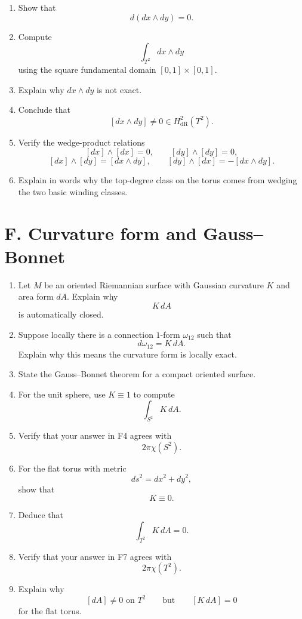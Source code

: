 \documentclass[11pt]{article}
\begin{document}
	\begin{enumerate}[leftmargin=2em,label=\textbf{E\arabic*.}]
		\item Show that
		\[
		d(dx\wedge dy)=0.
		\]
		
		\item Compute
		\[
		\int_{T^2}dx\wedge dy
		\]
		using the square fundamental domain \([0,1]\times[0,1]\).
		
		\item Explain why \(dx\wedge dy\) is not exact.
		
		\item Conclude that
		\[
		[dx\wedge dy]\neq 0 \in H^2_{\mathrm{dR}}(T^2).
		\]
		
		\item Verify the wedge-product relations
		\[
		[dx]\wedge[dx]=0,\qquad [dy]\wedge[dy]=0,
		\]
		\[
		[dx]\wedge[dy]=[dx\wedge dy],\qquad
		[dy]\wedge[dx]=-[dx\wedge dy].
		\]
		
		\item Explain in words why the top-degree class on the torus comes from wedging the two basic winding classes.
	\end{enumerate}
	
	\section*{F. Curvature form and Gauss--Bonnet}
	
	\begin{enumerate}[leftmargin=2em,label=\textbf{F\arabic*.}]
		\item Let \(M\) be an oriented Riemannian surface with Gaussian curvature \(K\) and area form \(dA\). Explain why
		\[
		K\,dA
		\]
		is automatically closed.
		
		\item Suppose locally there is a connection \(1\)-form \(\omega_{12}\) such that
		\[
		d\omega_{12}=K\,dA.
		\]
		Explain why this means the curvature form is locally exact.
		
		\item State the Gauss--Bonnet theorem for a compact oriented surface.
		
		\item For the unit sphere, use \(K\equiv 1\) to compute
		\[
		\int_{S^2}K\,dA.
		\]
		
		\item Verify that your answer in F4 agrees with
		\[
		2\pi\chi(S^2).
		\]
		
		\item For the flat torus with metric
		\[
		ds^2=dx^2+dy^2,
		\]
		show that
		\[
		K\equiv 0.
		\]
		
		\item Deduce that
		\[
		\int_{T^2}K\,dA=0.
		\]
		
		\item Verify that your answer in F7 agrees with
		\[
		2\pi\chi(T^2).
		\]
		
		\item Explain why
		\[
		[dA]\neq 0 \text{ on } T^2
		\qquad\text{but}\qquad
		[K\,dA]=0
		\]
		for the flat torus.
	\end{enumerate}
	
\end{document}
